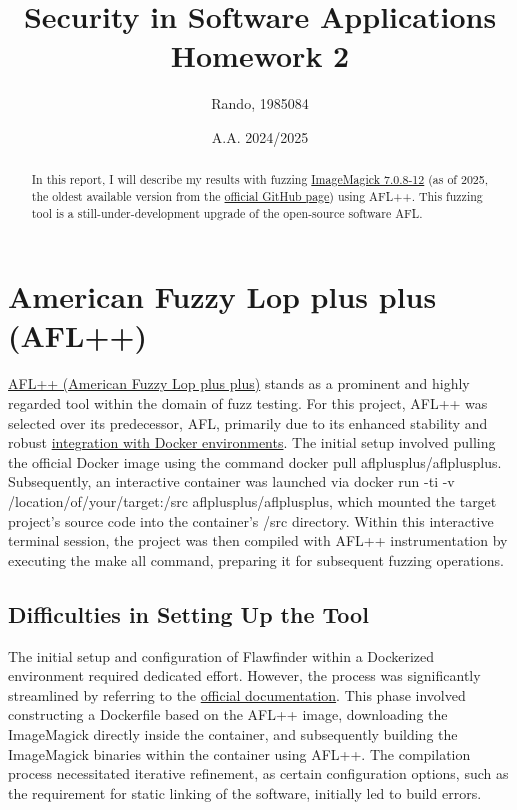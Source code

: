 \documentclass[a4paper,10pt]{article}
\title{Security in Software Applications\\Homework 2}
\author{Rando, 1985084}
\date{A.A. 2024/2025}
\begin{document}
\maketitle

\begin{abstract}
\noindent In this report, I will describe my results with fuzzing \href{https://github.com/ImageMagick/ImageMagick/releases/tag/7.0.8-12}{ImageMagick 7.0.8-12} (as of 2025, the oldest available version from the \href{https://github.com/ImageMagick/ImageMagick/releases}{official GitHub page}) using AFL++. This fuzzing tool is a still-under-development upgrade of the open-source software AFL.
\end{abstract}

\section{American Fuzzy Lop plus plus (AFL++)}

\href{https://github.com/AFLplusplus/AFLplusplus}{AFL++ (American Fuzzy Lop plus plus)} stands as a prominent and highly regarded tool within the domain of fuzz testing. For this project, AFL++ was selected over its predecessor, AFL, primarily due to its enhanced stability and robust \href{https://github.com/nathaniel-bennett/aflplusplus-docker/blob/main/docs/INSTALL.md}{integration with Docker environments}. The initial setup involved pulling the official Docker image using the command docker pull aflplusplus/aflplusplus. Subsequently, an interactive container was launched via docker run -ti -v /location/of/your/target:/src aflplusplus/aflplusplus, which mounted the target project's source code into the container's /src directory. Within this interactive terminal session, the project was then compiled with AFL++ instrumentation by executing the make all command, preparing it for subsequent fuzzing operations.


\subsection{Difficulties in Setting Up the Tool}


The initial setup and configuration of Flawfinder within a Dockerized environment required dedicated effort. However, the process was significantly streamlined by referring to the \href{https://github.com/AFLplusplus/AFLplusplus/blob/stable/docs/README.md}{official documentation}. This phase involved constructing a Dockerfile based on the AFL++ image, downloading the ImageMagick directly inside the container, and subsequently building the ImageMagick binaries within the container using AFL++. The compilation process necessitated iterative refinement, as certain configuration options, such as the requirement for static linking of the software, initially led to build errors.
\end{document}
